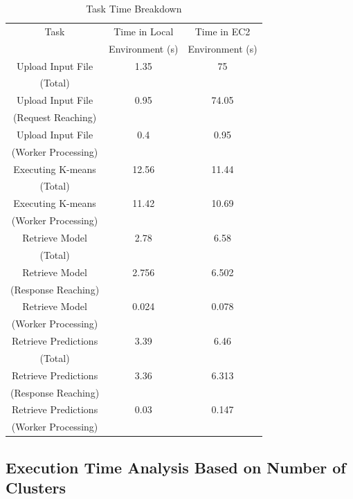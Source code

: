 \begin{table}[htbp]
	\centering
	\caption{Task Time Breakdown}\label{tbl:tasktimebreakdown}
	\begin{tabular}{*{3}{c}}
		\toprule
		Task & Time in Local   & Time in EC2 \\
		     & Environment (s) & Environment (s) \\
		\midrule
		Upload Input File &  1.35  &  75  \\
		(Total)           &        &      \\ 
		\midrule
		Upload Input File &  0.95  &  74.05  \\
		(Request Reaching)&        &         \\
		\midrule
		Upload Input File &  0.4   &  0.95 \\
		(Worker Processing)	&      &       \\
		\midrule
		Executing K-means &  12.56 &  11.44 \\
		(Total)           &        &        \\
		\midrule
		Executing K-means &  11.42 &  10.69  \\
		(Worker Processing) &      &         \\
		\midrule
		Retrieve Model &  2.78  &  6.58  \\
		(Total)  &     &      \\
		\midrule
		Retrieve Model &  2.756  &  6.502	\\
		(Response Reaching) &    &          \\
		\midrule
		Retrieve Model &   0.024   &  0.078 \\
		(Worker Processing)  &     &        \\
		\midrule
		Retrieve Predictions  &   3.39   &   6.46  \\
		(Total)  &            &       \\
		\midrule
		Retrieve Predictions  &    3.36  &   6.313 \\
		(Response Reaching)  &      &      \\
		\midrule
		Retrieve Predictions &   0.03  &   0.147 \\
		(Worker Processing)  &         &         \\
		\bottomrule
	\end{tabular}
\end{table}


\subsection{Execution Time Analysis Based on Number of Clusters}

